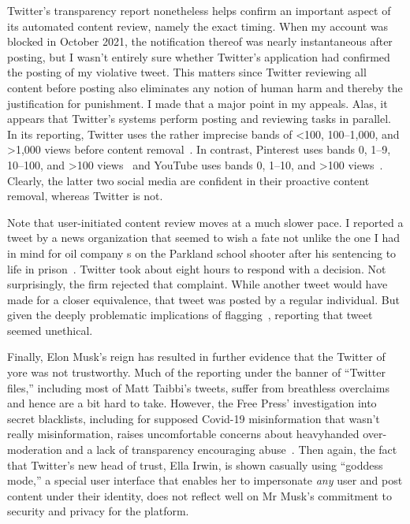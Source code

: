Twitter's transparency report nonetheless helps confirm an important aspect of
its automated content review, namely the exact timing. When my account was
blocked in October 2021, the notification thereof was nearly instantaneous after
posting, but I wasn't entirely sure whether Twitter's application had confirmed
the posting of my violative tweet. This matters since Twitter reviewing all
content before posting also eliminates any notion of human harm and thereby the
justification for punishment. I made that a major point in my appeals. Alas, it
appears that Twitter's systems perform posting and reviewing tasks in parallel.
In its reporting, Twitter uses the rather imprecise bands of <100, 100--1,000,
and >1,000 views before content removal~\cite{Twitter2021}. In contrast,
Pinterest uses bands 0, 1--9, 10--100, and >100 views~\cite{Pinterest2022} and
YouTube uses bands 0, 1--10, and >100 views~\cite{Google2022}. Clearly, the
latter two social media are confident in their proactive content removal,
whereas Twitter is not.

Note that user-initiated content review moves at a much slower pace. I reported
a tweet by a news organization that seemed to wish a fate not unlike the one I
had in mind for oil company s on the Parkland school shooter after his
sentencing to life in prison~\cite{ShapiroDeliso2022}. Twitter took about eight
hours to respond with a decision. Not surprisingly, the firm rejected that
complaint. While another tweet would have made for a closer equivalence, that
tweet was posted by a regular individual. But given the deeply problematic
implications of flagging~\cite{CrawfordGillespie2016}, reporting that tweet
seemed unethical.

Finally, Elon Musk's reign has resulted in further evidence that the Twitter of
yore was not trustworthy. Much of the reporting under the banner of ``Twitter
files,'' including most of Matt Taibbi's tweets, suffer from breathless
overclaims and hence are a bit hard to take. However, the Free Press'
investigation into secret blacklists, including for supposed Covid-19
misinformation that wasn't really misinformation, raises uncomfortable concerns
about heavyhanded over-moderation and a lack of transparency encouraging
abuse~\cite{WeissShrierea2022,Zweig2022}. Then again, the fact that Twitter's
new head of trust, Ella Irwin, is shown casually using ``goddess mode,'' a
special user interface that enables her to impersonate \emph{any} user and post
content under their identity, does not reflect well on Mr Musk's commitment to
security and privacy for the platform.
